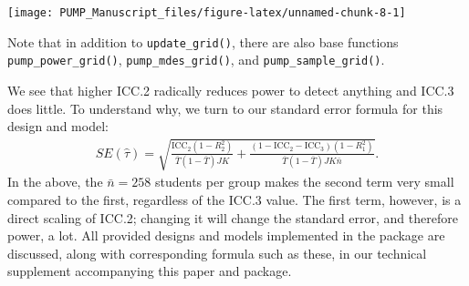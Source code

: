 \documentclass[
]{article}
\newenvironment{Shaded}{\begin{snugshade}}{\end{snugshade}}
\newcommand{\AttributeTok}[1]{\textcolor[rgb]{0.77,0.63,0.00}{#1}}
\newcommand{\DecValTok}[1]{\textcolor[rgb]{0.00,0.00,0.81}{#1}}
\newcommand{\FloatTok}[1]{\textcolor[rgb]{0.00,0.00,0.81}{#1}}
\newcommand{\FunctionTok}[1]{\textcolor[rgb]{0.00,0.00,0.00}{#1}}
\newcommand{\NormalTok}[1]{#1}
\newcommand{\OtherTok}[1]{\textcolor[rgb]{0.56,0.35,0.01}{#1}}
\newcommand{\SpecialCharTok}[1]{\textcolor[rgb]{0.00,0.00,0.00}{#1}}
\newcommand{\StringTok}[1]{\textcolor[rgb]{0.31,0.60,0.02}{#1}}
\begin{document}
\begin{Shaded}
\end{Shaded}

\begin{center}\texttt{[image: PUMP\_Manuscript\_files/figure-latex/unnamed-chunk-8-1]} \end{center}

Note that in addition to \texttt{update\_grid()}, there are also base
functions \texttt{pump\_power\_grid()}, \texttt{pump\_mdes\_grid()}, and
\texttt{pump\_sample\_grid()}.

We see that higher ICC.2 radically reduces power to detect anything and
ICC.3 does little. To understand why, we turn to our standard error
formula for this design and model: \[
\begin{aligned}
SE( \hat{\tau} ) = \sqrt{
\frac{\text{ICC}_{2}(1 - R^2_{2})}{\bar{T}(1 - \bar{T}) JK} +
\frac{(1-\text{ICC}_{2} - \text{ICC}_{3})(1-R^2_{1})}{\bar{T}(1 - \bar{T}) J K\bar{n}} } .
\end{aligned}
\] In the above, the \(\bar{n} = 258\) students per group makes the
second term very small compared to the first, regardless of the ICC.3
value. The first term, however, is a direct scaling of ICC.2; changing
it will change the standard error, and therefore power, a lot. All
provided designs and models implemented in the package are discussed,
along with corresponding formula such as these, in our technical
supplement accompanying this paper and package.
\end{document}

